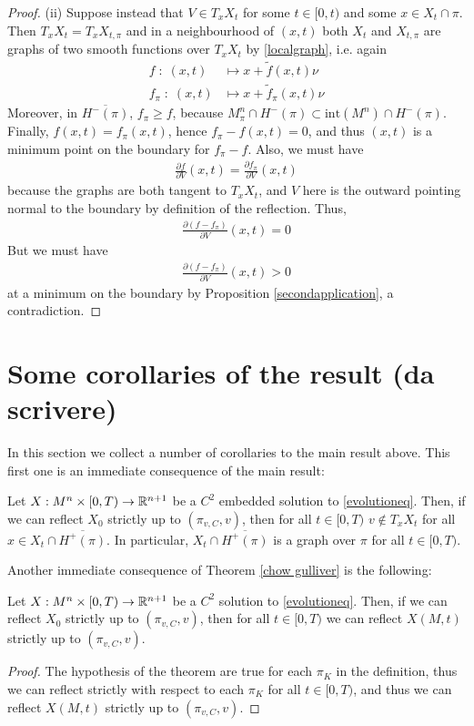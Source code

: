\begin{proof}
	(ii) Suppose instead that $V\in T_xX_t$  for some $t\in [0, t)$ and some $x\in X_t\cap \pi$. Then $T_xX_t= T_xX_{t, \pi}$ and in a neighbourhood of $(x, t)$ both $X_t$ and $X_{t, \pi}$ are graphs of two smooth functions over $T_xX_t$ by \ref{localgraph}, i.e. again
	\begin{align*}
		f \; : \; (x, t) &\mapsto x+\tilde{f}(x, t)\nu \\
		f_\pi \; : \; (x, t) &\mapsto x+\tilde{f}_\pi(x, t)\nu 
	\end{align*} 
	Moreover, in $\overline{H^-(\pi)}$, $f_\pi\geq f$, because $M^n_\pi\cap H^-(\pi)\subset \mathrm{int}(M^n)\cap H^-(\pi)$. Finally, $f(x, t)=f_\pi (x, t)$, hence $f_\pi-f (x, t)=0$, and thus  $(x, t)$ is a minimum point on the boundary for $f_\pi-f$. Also, we must have
	\begin{align*}
		\frac{\partial f}{\partial V}(x,t)=\frac{\partial f_\pi}{\partial V}(x,t)
	\end{align*}
	because the graphs are both tangent to $T_xX_t$, and $V$ here is the outward pointing normal to the boundary by definition of the reflection. Thus, 
	\begin{align*}
		\frac{\partial (f- f_\pi)}{\partial V}(x,t)=0
	\end{align*}
	But we must have 
	\begin{align*}
		\frac{\partial (f- f_\pi)}{\partial V}(x,t)>0
	\end{align*}
	at a minimum on the boundary by Proposition \ref{secondapplication}, a contradiction.  
\end{proof}


\section{Some corollaries of the result (da scrivere)} 
In this section we collect a number of corollaries to the main result above. This first one is an immediate consequence of the main result:
\begin{cor}
	Let $X:M^n\times [0,T) \rightarrow \mathbb{R}^{n+1}$ be a $C^2$ embedded solution to \ref{evolutioneq}. Then, if we can reflect $X_0$ strictly up to $(\pi_{v,C},v)$, then for all $t\in [0,T)$ $v\notin T_xX_t$ for all $x\in X_t\cap\overline{H^+(\pi)}$. In particular,  $ X_t\cap\overline{H^+(\pi)}$ is a graph over $\pi$ for all $t\in [0,T)$.
\end{cor}




Another immediate consequence of Theorem \ref{chow gulliver} is the following:
\begin{cor}
	Let $X:M^n\times [0,T) \rightarrow \mathbb{R}^{n+1}$ be a $C^2$ solution to \ref{evolutioneq}. Then, if we can reflect $X_0$ strictly up to $(\pi_{v,C},v)$, then for all $t\in [0,T)$ we can reflect $X(M, t)$ strictly up to $(\pi_{v,C},v)$.  
\end{cor}
\begin{proof}
	The hypothesis of the theorem are true for each $\pi_K$ in the definition, thus we can reflect strictly with respect to each $\pi_K$ for all $t\in[0,T)$, and thus we can reflect $X(M, t)$ strictly up to $(\pi_{v,C},v)$.
\end{proof}

